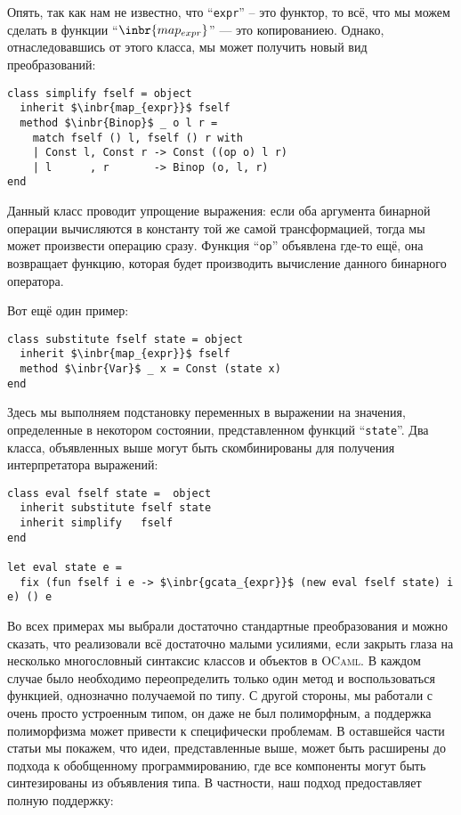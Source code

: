 Опять, так как нам не известно, что ``\lstinline{expr}'' -- это функтор, то всё, что мы можем сделать в функции ``$\inbr{map_{expr}}$'' --- 
это копированиею. Однако, отнаследовавшись от этого класса, мы может получить новый вид преобразований:

\begin{lstlisting}
class simplify fself = object 
  inherit $\inbr{map_{expr}}$ fself
  method $\inbr{Binop}$ _ o l r =
    match fself () l, fself () r with
    | Const l, Const r -> Const ((op o) l r)
    | l      , r       -> Binop (o, l, r)     
end
\end{lstlisting}

Данный класс проводит упрощение выражения: если оба аргумента бинарной операции вычисляются в константу той же самой трансформацией, тогда 
мы может произвести операцию сразу. Функция ``\lstinline{op}'' объявлена где-то ещё, она возвращает функцию, которая будет производить вычисление данного бинарного оператора.

Вот ещё один пример:

\begin{lstlisting}
class substitute fself state = object 
  inherit $\inbr{map_{expr}}$ fself
  method $\inbr{Var}$ _ x = Const (state x)  
end
\end{lstlisting}

Здесь мы выполняем подстановку переменных в выражении на значения, определенные в некотором состоянии, представленном функций ``\lstinline{state}''. Два класса, объявленных выше могут быть скомбинированы для получения интерпретатора выражений:

\begin{lstlisting}
class eval fself state =  object
  inherit substitute fself state
  inherit simplify   fself
end

let eval state e =
  fix (fun fself i e -> $\inbr{gcata_{expr}}$ (new eval fself state) i e) () e  
\end{lstlisting}

Во всех примерах мы выбрали достаточно стандартные преобразования и можно сказать, что реализовали всё достаточно малыми усилиями,
если закрыть глаза на несколько многословный синтаксис классов и объектов в  \textsc{OCaml}. В каждом случае было необходимо переопределить
только один метод и воспользоваться функцией, однозначно получаемой по типу. 
С другой стороны, мы работали с очень просто устроенным типом, он даже не был полиморфным, а поддержка полиморфизма может привести к 
специфически проблемам. В оставшейся части статьи мы покажем, что идеи, представленные выше, может быть расширены до подхода к обобщенному программированию, где все компоненты могут быть синтезированы из объявления типа. В частности, наш подход предоставляет полную поддержку:

